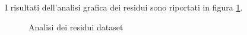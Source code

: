 I risultati dell'analisi grafica dei residui sono riportati in figura \ref{fig:residui_pm10}.

\begin{figure}[H]
\centering
{}\hfil
{}

\hfil
{}
\caption{Analisi dei residui dataset }
\label{fig:residui_pm10}
\end{figure}

